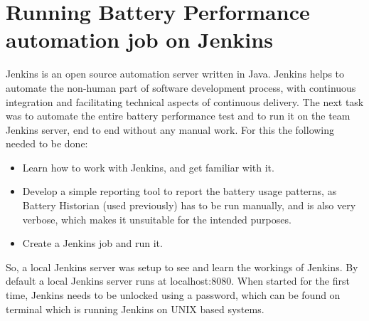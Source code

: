 \section{Running Battery Performance automation job on Jenkins}Jenkins is an open source automation server written in Java. Jenkins helps to automate the non-human part of software development process, with continuous integration and facilitating technical aspects of continuous delivery. The next task was to automate the entire battery performance test and to run it on the team Jenkins server, end to end without any manual work. For this the following needed to be done:
\begin{itemize}
	\item Learn how to work with Jenkins, and get familiar with it.
	\item Develop a simple reporting tool to report the battery usage patterns, as Battery Historian (used previously) has to be run manually, and is also very verbose, which makes it unsuitable for the intended purposes.
	\item Create a Jenkins job and run it.
\end{itemize}

So, a local Jenkins server was setup to see and learn the workings of Jenkins. By default a local Jenkins server runs at localhost:8080. When started for the first time, Jenkins needs to be unlocked using a password, which can be found on terminal which is running Jenkins on UNIX based systems.\\

